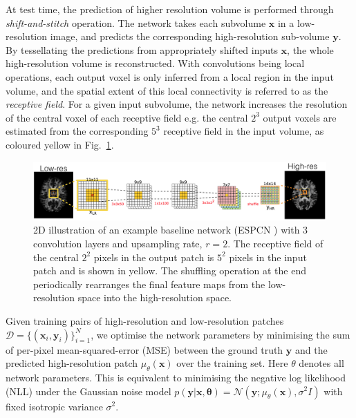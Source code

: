 At test time, the prediction of higher resolution volume is performed through \textit{shift-and-stitch} operation. The network takes each subvolume $\mathbf{x}$ in a low-resolution image, and predicts the corresponding high-resolution sub-volume $\mathbf{y}$. By tessellating the predictions from appropriately shifted inputs $\mathbf{x}$, the whole high-resolution volume is reconstructed. With convolutions being local operations, each output voxel is only inferred from a local region in the input volume, and the spatial extent of this local connectivity is referred to as the \textit{receptive field}. For a given input subvolume, the network increases the resolution of the central voxel of each receptive field e.g. the central $2^3$ output voxels are estimated from the corresponding $5^3$ receptive field in the input volume, as coloured yellow in Fig.~\ref{fig:ESPCN}.

\begin{figure}[t]
	\includegraphics[width=\linewidth]{chapter_3/figures/fig_1_2.png}
	\centering	
	\caption{\small 2D illustration of an example baseline network (ESPCN \cite{shi2016real}) with $3$ convolution layers and upsampling rate, $r=2$. The receptive field of the central $2^2$ pixels in the output patch is $5^2$ pixels in the input patch and is shown in yellow. The shuffling operation at the end periodically rearranges the final feature maps from the low-resolution space into the high-resolution space.} 
	\label{fig:ESPCN}
	
\end{figure}


Given training pairs of high-resolution and low-resolution patches $\mathcal{D}=\{(\mathbf{x}_i,\mathbf{y}_i)\}_{i=1}^N$, we optimise the network parameters by minimising the sum of per-pixel mean-squared-error (MSE) between the ground truth $\mathbf{y}$ and the predicted high-resolution patch $\mu_{\theta}(\mathbf{x})$ over the training set. Here $\theta$ denotes all network parameters. This is equivalent to minimising the negative log likelihood (NLL) under the Gaussian noise model $p(\mathbf{y}|\mathbf{x},\mathbf{\theta}) = \mathcal{N}(\mathbf{y}; \mu_{\theta}(\mathbf{x}), \sigma^2I)$ with fixed isotropic variance $\sigma^2$. %

